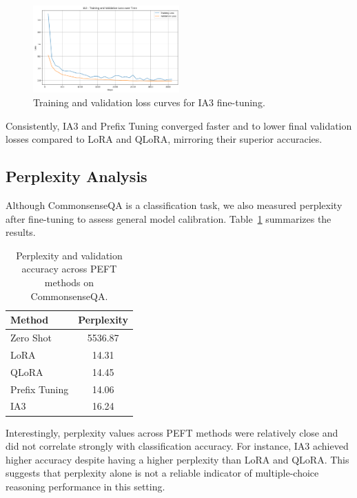 \documentclass[11pt,twocolumn]{article}
\begin{document}
\begin{figure}[h]
\centering
\includegraphics[width=0.5\textwidth]{../graphs/IA3.png}
\caption{Training and validation loss curves for IA3 fine-tuning.}
\label{fig:ia3-loss}
\end{figure}

Consistently, IA3 and Prefix Tuning converged faster and to lower final validation losses compared to LoRA and QLoRA, mirroring their superior accuracies.

\subsection{Perplexity Analysis}

Although CommonsenseQA is a classification task, we also measured perplexity after fine-tuning to assess general model calibration. Table~\ref{table:perplexity-accuracy} summarizes the results.

\begin{table}[h]
\centering
\renewcommand{\arraystretch}{1.2}
\begin{tabular}{|l|c|}
\hline
\textbf{Method} & \textbf{Perplexity}\\
\hline
Zero Shot & 5536.87\\
LoRA & 14.31 \\
QLoRA & 14.45\\
Prefix Tuning & 14.06\\
IA3 & 16.24\\
\hline
\end{tabular}
\caption{Perplexity and validation accuracy across PEFT methods on CommonsenseQA.}
\label{table:perplexity-accuracy}
\end{table}

Interestingly, perplexity values across PEFT methods were relatively close and did not correlate strongly with classification accuracy. For instance, IA3 achieved higher accuracy despite having a higher perplexity than LoRA and QLoRA. This suggests that perplexity alone is not a reliable indicator of multiple-choice reasoning performance in this setting.
\end{document}
